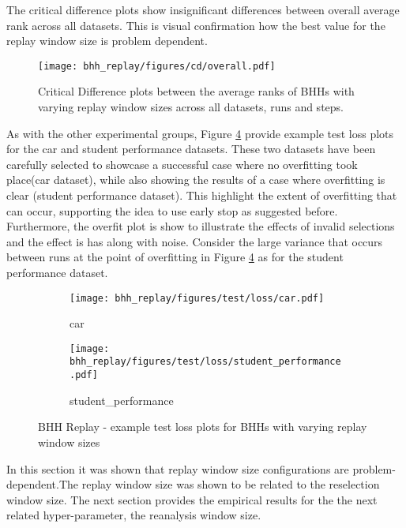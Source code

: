 The critical difference plots show insignificant differences between overall average rank across all datasets. This is visual confirmation how the best value for the replay window size is problem dependent.

\begin{figure}[htbp]
	\centering
	\texttt{[image: bhh\_replay/figures/cd/overall.pdf]}
	\caption{Critical Difference plots between the average ranks of \Acsp{BHH} with varying replay window sizes across all datasets, runs and steps.}
	\label{fig:results:replay:descriptive:cd}
\end{figure}


As with the other experimental groups, Figure \ref{fig:results:replay:figures:loss} provide example test loss plots for the car and student performance datasets. These two datasets have been carefully selected to showcase a successful case where no overfitting took place(car dataset), while also showing the results of a case where overfitting is clear (student performance dataset). This highlight the extent of overfitting that can occur, supporting the idea to use early stop as suggested before. Furthermore, the overfit plot is show to illustrate the effects of invalid selections and the effect is has along with noise. Consider the large variance that occurs between runs at the point of overfitting in Figure \ref{fig:results:replay:figures:loss} as for the student performance dataset.


\begin{figure}[htbp]
	\begin{subfigure}{0.5\textwidth}
		\centering
		\texttt{[image: bhh\_replay/figures/test/loss/car.pdf]}
		\caption{car}
		\label{fig:results:replay:figures:loss1}
	\end{subfigure}
	\begin{subfigure}{0.5\textwidth}
		\centering
		\texttt{[image: bhh\_replay/figures/test/loss/student\_performance.pdf]}
		\caption{student\_performance}
		\label{fig:results:replay:figures:loss2}
	\end{subfigure}
	\caption{\Acs{BHH} Replay - example test loss plots for \Acsp{BHH} with varying replay window sizes}
	\label{fig:results:replay:figures:loss}
\end{figure}

In this section it was shown that replay window size configurations are problem-dependent.The replay window size was shown to be related to the reselection window size. The next section provides the empirical results for the the next related hyper-parameter, the reanalysis window size.







